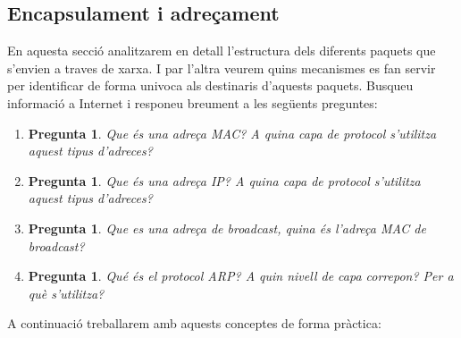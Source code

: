 \documentclass[12pt,a4paper]{article}
\newcounter{exercises}
\newtheorem{exer}[exercises]{Pregunta}
\begin{document}
\subsection{Encapsulament i adreçament}
En aquesta secció analitzarem en detall l'estructura dels diferents paquets que s'envien a traves de xarxa. I par l'altra
veurem quins mecanismes es fan servir per identificar de forma univoca als destinaris d'aquests paquets. Busqueu informació a Internet i responeu breument a les següents preguntes:
\begin{enumerate} 
 \item \begin{exer} Que és una adreça MAC? A quina capa de protocol s'utilitza aquest tipus d'adreces? \end{exer}
 \item \begin{exer} Que és una adreça IP?  A quina capa de protocol s'utilitza aquest tipus d'adreces?   \end{exer}
 \item \begin{exer} Que es una adreça de broadcast, quina és l'adreça MAC de broadcast? \end{exer}
 \item \begin{exer} Qué és el protocol ARP? A quin nivell de capa correpon? Per a què s'utilitza? \end{exer}
\end{enumerate}

A continuació treballarem amb aquests conceptes de forma pràctica:
\end{document}
